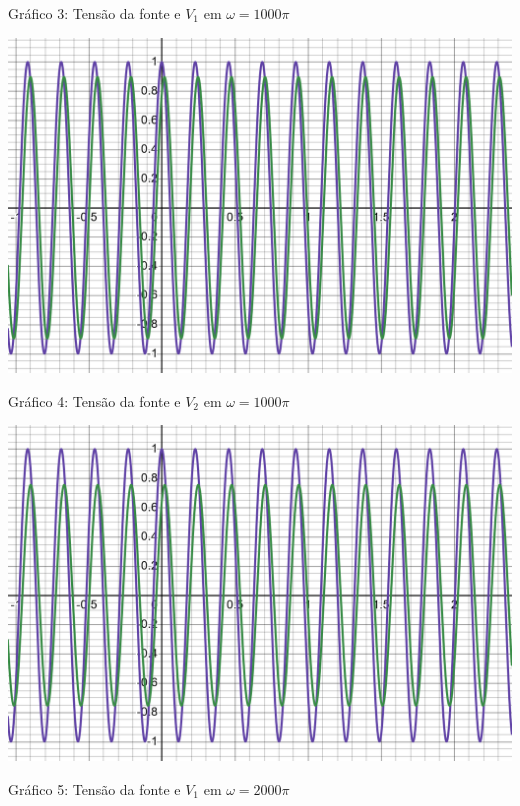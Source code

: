 \documentclass[a4 paper]{article}
\begin{document}
\begin{center}
Gráfico 3: Tensão da fonte e $V_1$ em $\omega =1000\pi$
\end{center}

\vspace{30pt}
\begin{table}[h]
\centering
\includegraphics[scale=0.25]{rgadicoas/grafico6}
\end{table}

\begin{center}
Gráfico 4: Tensão da fonte e $V_2$ em $\omega =1000\pi$
\end{center}

\begin{table}[h]
\centering
\includegraphics[scale=0.25]{rgadicoas/grafico3}
\end{table}

\newpage
\begin{center}
Gráfico 5: Tensão da fonte e $V_1$ em $\omega =2000\pi$
\end{center}
\end{document}
